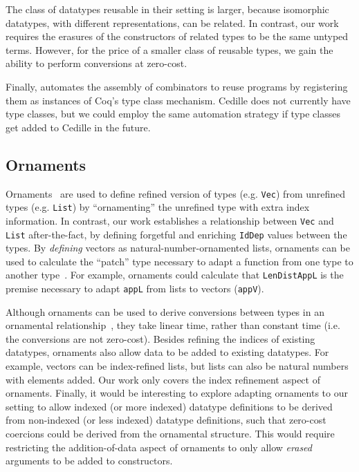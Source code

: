 \documentclass[acmsmall]{acmart}\settopmatter{}
\begin{document}
The class of datatypes reusable in their setting is larger, because
isomorphic datatypes, with different representations, can be
related. In contrast, our work requires the erasures of the
constructors of related types to be the same untyped terms. However,
for the price of a smaller class of reusable types, we gain the
ability to perform conversions at zero-cost.

Finally, \citet{dagand:interop} automates the assembly of combinators
to reuse programs by registering them as instances of Coq's type
class mechanism. Cedille does not currently have type classes, but we could
employ the same automation strategy if type classes get added to
Cedille in the future.

\subsection{Ornaments}

Ornaments~\cite{ornaments:original} are used to define refined
version of types (e.g. \texttt{Vec}) from unrefined types
(e.g. \texttt{List}) by ``ornamenting'' the unrefined type with extra
index information. In contrast, our work establishes a relationship
between \texttt{Vec} and \texttt{List} after-the-fact, by defining
forgetful and enriching \verb;IdDep; values between the types.
By \textit{defining} vectors as natural-number-ornamented lists,
ornaments can be used to calculate the ``patch'' type necessary to adapt a
function from one type to another type~\cite{ornaments:functional}.
For example, ornaments could
calculate that \texttt{LenDistAppL} is the premise necessary to adapt
\texttt{appL} from lists to vectors (\texttt{appV}).

Although ornaments can be used to derive conversions between
types in an ornamental
relationship~\cite{ornaments:original,ornaments:relational},
they take linear time, rather than constant time (i.e. the conversions
are not zero-cost).
Besides refining the indices of existing datatypes, ornaments
also allow data to be added to existing datatypes. For example, vectors can
be index-refined lists, but lists can also be natural numbers with
elements added. Our work only covers the index refinement aspect of
ornaments. Finally, it would be interesting to explore adapting
ornaments to our setting to allow indexed (or more indexed) datatype
definitions to be derived from non-indexed (or less indexed) datatype
definitions, such that zero-cost coercions could be derived from the
ornamental structure. This would require restricting the
addition-of-data aspect of ornaments to only allow \textit{erased}
arguments to be added to constructors.
\end{document}
